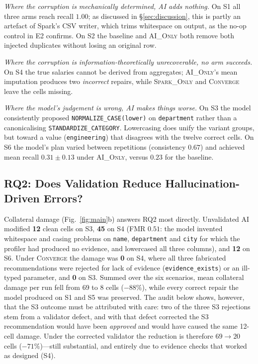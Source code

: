 \emph{Where the corruption is mechanically determined, AI adds nothing.} On S1 all three arms reach recall $1.00$; as discussed in \S\ref{sec:discussion}, this is partly an artefact of Spark's CSV writer, which trims whitespace on output, as the no-op control in E2 confirms. On S2 the baseline and \textsc{AI\_Only} both remove both injected duplicates without losing an original row.

\emph{Where the corruption is information-theoretically unrecoverable, no arm succeeds.} On S4 the true salaries cannot be derived from aggregates; \textsc{AI\_Only}'s mean imputation produces two \emph{incorrect} repairs, while \textsc{Spark\_Only} and \textsc{Converge} leave the cells missing.

\emph{Where the model's judgement is wrong, AI makes things worse.} On S3 the model consistently proposed \texttt{NORMALIZE\_CASE(lower)} on \texttt{department} rather than a canonicalising \texttt{STANDARDIZE\_CATEGORY}. Lowercasing does unify the variant groups, but toward a value (\texttt{engineering}) that disagrees with the twelve correct cells. On S6 the model's plan varied between repetitions (consistency $0.67$) and achieved mean recall $0.31\pm0.13$ under \textsc{AI\_Only}, versus $0.23$ for the baseline.

\subsection{RQ2: Does Validation Reduce Hallucination-Driven Errors?}
\label{sec:res-rq2}
Collateral damage (Fig.~\ref{fig:main}b) answers RQ2 most directly. Unvalidated AI modified \textbf{12} clean cells on S3, \textbf{45} on S4 (FMR $0.51$: the model invented whitespace and casing problems on \texttt{name}, \texttt{department} and \texttt{city} for which the profiler had produced no evidence, and lowercased all three columns), and \textbf{12} on S6. Under \textsc{Converge} the damage was \textbf{0} on S4, where all three fabricated recommendations were rejected for lack of evidence (\texttt{evidence\_exists}) or an ill-typed parameter, and \textbf{0} on S3. Summed over the six scenarios, mean collateral damage per run fell from $69$ to $8$ cells ($-88\%$), while every correct repair the model produced on S1 and S5 was preserved. The audit below shows, however, that the S3 outcome must be attributed with care: two of the three S3 rejections stem from a validator defect, and with that defect corrected the S3 recommendation would have been \emph{approved} and would have caused the same 12-cell damage. Under the corrected validator the reduction is therefore $69\to20$ cells ($-71\%$)---still substantial, and entirely due to evidence checks that worked as designed (S4).

